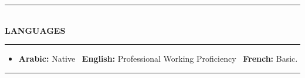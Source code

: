 \documentclass[10pt, a4paper]{article}
\newcommand{\cvsection}[1]{%
  \vspace{3pt}%
  {\color{navy}\rule{\linewidth}{1.1pt}}\\[0.5pt]%
  {\color{navy}\bfseries\fontsize{9.5}{11}\selectfont\uppercase{#1}}\\[-4pt]%
  {\color{teal}\rule{\linewidth}{0.6pt}}%
  \vspace{2pt}%
}
\newenvironment{cvitems}{%
  \begin{itemize}[leftmargin=11pt, itemsep=0.5pt, parsep=0pt, topsep=1pt,
                  label={\textcolor{teal}{$\bullet$}}]
}{%
  \end{itemize}%
}
\begin{document}
\cvsection{Languages}

\begin{cvitems}
  \item \textbf{Arabic:} Native \textperiodcentered\ \textbf{English:} Professional Working Proficiency \textperiodcentered\ \textbf{French:} Basic.
\end{cvitems}

\vspace{3pt}
{\color{navy}\rule{\linewidth}{0.8pt}}
\end{document}

